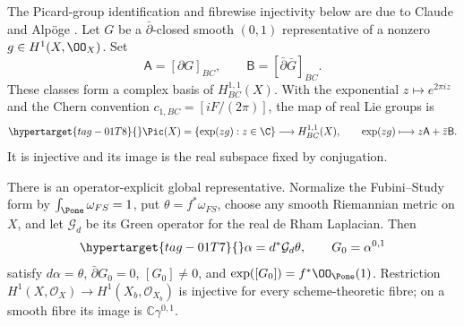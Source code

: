 \begin{proposition}\hypertarget{tag-01SE}{}\label{inv:C3.1}\label{wb:cor:picard-line-audit}

The Picard-group identification and fibrewise injectivity below are due to Claude and Alp\"oge \cite[Theorem~10.5(b), proof Steps~1 and~4, p.~88]{AC2026}. Let $G$ be a $\bar\partial$-closed smooth $(0,1)$ representative of
a nonzero $g\in H^1(X,\OO_X)$.  Set
\[
\mathsf A=[\partial G]_{BC},\qquad
\mathsf B=[\bar\partial\bar G]_{BC}.
\]
These classes form a complex basis of $H^{1,1}_{BC}(X)$.
With the exponential $z\mapsto e^{2\pi iz}$ and the Chern convention
$c_{1,BC}=[iF/(2\pi)]$, the map of real Lie groups is
\begin{equation}\hypertarget{tag-01T8}{}\label{inv:eq:C-Pic-map}
\Pic(X)=\{\exp(zg):z\in\C\}\longrightarrow H^{1,1}_{BC}(X),
\qquad \exp(zg)\longmapsto z\mathsf A+\bar z\mathsf B.
\end{equation}
It is injective and its image is the real subspace fixed by conjugation.

There is an operator-explicit global representative.  Normalize the
Fubini--Study form by $\int_{\Pone}\omega_{FS}=1$, put
$\theta=f^*\omega_{FS}$, choose any smooth Riemannian metric on $X$,
and let $\mathcal G_d$ be its Green operator for the real de Rham
Laplacian.  Then
\begin{equation}\hypertarget{tag-01T7}{}\label{inv:eq:C-G-Green}
\alpha=d^*\mathcal G_d\theta,\qquad G_0=\alpha^{0,1}
\end{equation}
satisfy $d\alpha=\theta$, $\bar\partial G_0=0$,
$[G_0]\ne0$, and $\exp([G_0])=f^*\OO_{\Pone}(1)$.
Restriction $H^1(X,\mathcal O_X)\to H^1(X_b,\mathcal O_{X_b})$ is injective for every scheme-theoretic fibre; on a smooth fibre its image is $\mathbb C\gamma^{0,1}$.
\end{proposition}

